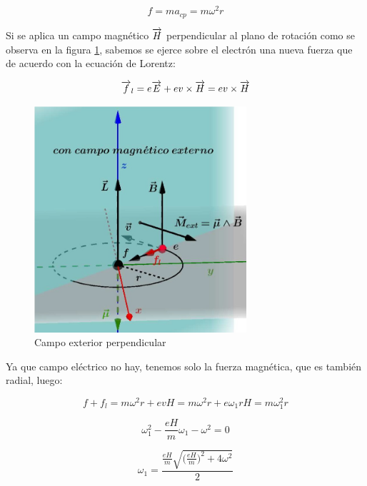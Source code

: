 \begin{equation}
  f=ma_{cp}=m\omega^{2} r
\end{equation}

Si se aplica un campo magnético $\overrightarrow{H}$ perpendicular al plano de rotación como se observa en la figura \ref{fig:s9}, sabemos se ejerce sobre el electrón una nueva fuerza que de acuerdo con la ecuación de Lorentz:

\begin{equation}
  \overrightarrow{f}_{l}= e\overrightarrow{E} + ev \times \overrightarrow{H} = ev \times \overrightarrow{H}
\end{equation}

\begin{figure}[H]
    \centering
    \includegraphics[width=0.7\textwidth]{./Figures/fig_s9}
	\caption{Campo exterior perpendicular}
	\label{fig:s9}
\end{figure}



Ya que campo eléctrico no hay, tenemos solo la fuerza magnética, que es también radial, luego:

\begin{equation}
  f+f_{l}= m\omega^{2}r+ evH = m\omega^{2}r+ e\omega_{1}rH=m\omega_{1}^{2}r
\end{equation}

\begin{equation}
  \omega_{1}^{2}-\frac{eH}{m}\omega_{1}-\omega^{2} =0
\end{equation}

\begin{equation}
	\omega_{1}=\frac{\frac{eH}{m}\sqrt{\big(\frac{eH}{m}\big)^{2}+4\omega^{2}}}{2}
\end{equation}

